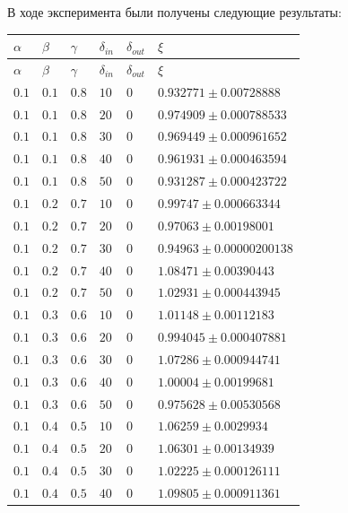 \documentclass[14pt]{extreport}
\begin{document}
В ходе эксперимента были получены следующие результаты:

\begin{center}
\begin{longtable}{|p{1cm}|p{1cm}|p{1cm}|p{1cm}|p{1cm}|p{8cm}|} \hline
$\alpha$ & $\beta$ & $\gamma$ & $\delta_{in}$ & $\delta_{out}$ & $\xi$ \\ \hline
\endfirsthead
\hline
$\alpha$ & $\beta$ & $\gamma$ & $\delta_{in}$ & $\delta_{out}$ & $\xi$ \\ \hline
\endhead
\endfoot
\endlastfoot
$0.1$ & $0.1$ & $0.8$ & $10$ & $0$ & $0.932771 \pm 0.00728888$ \\ \hline
$0.1$ & $0.1$ & $0.8$ & $20$ & $0$ & $0.974909 \pm 0.000788533$ \\ \hline
$0.1$ & $0.1$ & $0.8$ & $30$ & $0$ & $0.969449 \pm 0.000961652$ \\ \hline
$0.1$ & $0.1$ & $0.8$ & $40$ & $0$ & $0.961931 \pm 0.000463594$ \\ \hline
$0.1$ & $0.1$ & $0.8$ & $50$ & $0$ & $0.931287 \pm 0.000423722$ \\ \hline
$0.1$ & $0.2$ & $0.7$ & $10$ & $0$ & $0.99747 \pm 0.000663344$ \\ \hline
$0.1$ & $0.2$ & $0.7$ & $20$ & $0$ & $0.97063 \pm 0.00198001$ \\ \hline
$0.1$ & $0.2$ & $0.7$ & $30$ & $0$ & $0.94963 \pm 0.00000200138$ \\ \hline
$0.1$ & $0.2$ & $0.7$ & $40$ & $0$ & $1.08471 \pm 0.00390443$ \\ \hline
$0.1$ & $0.2$ & $0.7$ & $50$ & $0$ & $1.02931 \pm 0.000443945$ \\ \hline
$0.1$ & $0.3$ & $0.6$ & $10$ & $0$ & $1.01148 \pm 0.00112183$ \\ \hline
$0.1$ & $0.3$ & $0.6$ & $20$ & $0$ & $0.994045 \pm 0.000407881$ \\ \hline
$0.1$ & $0.3$ & $0.6$ & $30$ & $0$ & $1.07286 \pm 0.000944741$ \\ \hline
$0.1$ & $0.3$ & $0.6$ & $40$ & $0$ & $1.00004 \pm 0.00199681$ \\ \hline
$0.1$ & $0.3$ & $0.6$ & $50$ & $0$ & $0.975628 \pm 0.00530568$ \\ \hline
$0.1$ & $0.4$ & $0.5$ & $10$ & $0$ & $1.06259 \pm 0.0029934$ \\ \hline
$0.1$ & $0.4$ & $0.5$ & $20$ & $0$ & $1.06301 \pm 0.00134939$ \\ \hline
$0.1$ & $0.4$ & $0.5$ & $30$ & $0$ & $1.02225 \pm 0.000126111$ \\ \hline
$0.1$ & $0.4$ & $0.5$ & $40$ & $0$ & $1.09805 \pm 0.000911361$ \\ \hline

\end{longtable}
\end{center}
\end{document}
